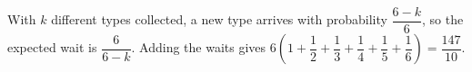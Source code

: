 With $k$ different types collected, a new type arrives with probability $\dfrac{6-k}{6}$, so the expected wait is $\dfrac{6}{6-k}$. Adding the waits gives $6(1+\dfrac{1}{2}+\dfrac{1}{3}+\dfrac{1}{4}+\dfrac{1}{5}+\dfrac{1}{6})=\boxed{\dfrac{147}{10}}$.
